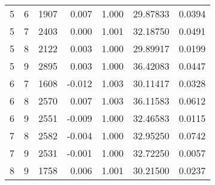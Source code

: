\begin{longtable}{rrrrrrr}
5 & 6 & 1907 & 0.007 & 1.000 & 29.87833 & 0.0394 \\ 
5 & 7 & 2403 & 0.000 & 1.001 & 32.18750 & 0.0491 \\ 
5 & 8 & 2122 & 0.003 & 1.000 & 29.89917 & 0.0199 \\ 
5 & 9 & 2895 & 0.003 & 1.000 & 36.42083 & 0.0447 \\ 
6 & 7 & 1608 & -0.012 & 1.003 & 30.11417 & 0.0328 \\ 
6 & 8 & 2570 & 0.007 & 1.003 & 36.11583 & 0.0612 \\ 
6 & 9 & 2551 & -0.009 & 1.000 & 32.46583 & 0.0115 \\ 
7 & 8 & 2582 & -0.004 & 1.000 & 32.95250 & 0.0742 \\ 
7 & 9 & 2531 & -0.001 & 1.000 & 32.72250 & 0.0057 \\ 
8 & 9 & 1758 & 0.006 & 1.001 & 30.21500 & 0.0237 \\ 
\bottomrule
\end{longtable}

